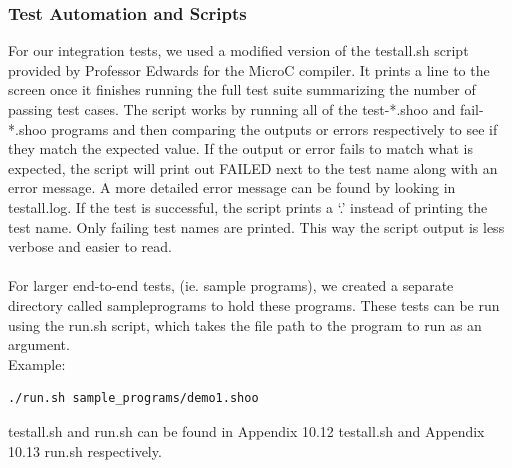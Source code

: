\documentclass[12pt]{article}
\begin{document}
\subsubsection{Test Automation and Scripts}
For our integration tests, we used a modified version of the testall.sh script provided by Professor Edwards for the MicroC compiler. It prints a line to the screen once it finishes running the full test suite summarizing the number of passing test cases. The script works by running all of the test-*.shoo and fail-*.shoo programs and then comparing the outputs or errors respectively to see if they match the expected value. If the output or error fails to match what is expected, the script will print out FAILED next to the test name along with an error message. A more detailed error message can be found by looking in testall.log. If the test is successful, the script prints a `.' instead of printing the test name. Only failing test names are printed. This way the script output is less verbose and easier to read. \\
\\
For larger end-to-end tests, (ie. sample programs), we created a separate directory called sample\textunderscore programs to hold these programs. These tests can be run using the run.sh script, which takes the file path to the program to run as an argument.\\
Example:\\
\begin{lstlisting}
./run.sh sample_programs/demo1.shoo
\end{lstlisting}

testall.sh and run.sh can be found in Appendix 10.12 testall.sh and Appendix 10.13 run.sh respectively. \\
\\
\end{document}
